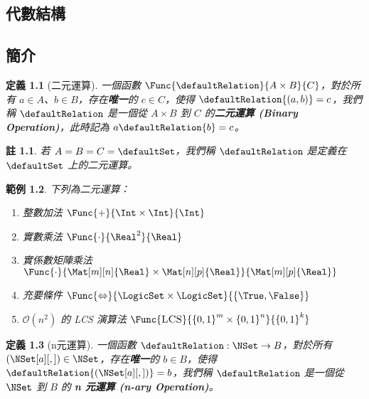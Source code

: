 \documentclass[12pt,a4paper,oneside]{report}
\begin{document}
\begin{CJK}{UTF8}{bkai}
\newtheorem{mydef}{定義}[chapter]
\newtheorem*{mydef*}{定義}
\newtheorem{myrule}[mydef]{原理}
\newtheorem{mythm}[mydef]{定理}
\newtheorem{mylma}[mydef]{引理}
\newtheorem{mypropo}[mydef]{性質}
\newtheorem{mycorol}[mydef]{推論}
\newtheorem{myexample}[mydef]{範例}
\newtheorem*{mynote*}{註}
\renewenvironment{proof}{\textbf{證明}}{\qed}
\newenvironment{mysol}{\textbf{解答}}{\qed}


\fi

\chapter{代數結構}
\section{簡介}

\begin{mydef}[二元運算]
\label{def:algebra:binary_operation}
一個函數 $\Func{\defaultRelation}{A\times{B}}{C}$，對於所有 $a\in{A}$、$b\in{B}$，存在\textbf{唯一}的 $c\in{C}$，使得 $\defaultRelation{(a,b)}=c$，我們稱 $\defaultRelation$ 是一個從 $A\times{B}$ 到 $C$ 的\textbf{二元運算 (Binary Operation)}，此時記為 $a\defaultRelation{b}=c$。
\end{mydef}
\begin{mynote*}
若 $A=B=C=\defaultSet$，我們稱 $\defaultRelation$ 是定義在 $\defaultSet$ 上的二元運算。
\end{mynote*}

\begin{myexample}下列為二元運算：
\begin{enumerate}
\item 整數加法 $\Func{+}{\Int\times{\Int}}{\Int}$
\item 實數乘法 $\Func{\cdot}{\Real^2}{\Real}$
\item 實係數矩陣乘法 $\Func{\cdot}{\Mat[m][n]{\Real}\times\Mat[n][p]{\Real}}{\Mat[m][p]{\Real}}$
\item 充要條件 $\Func{\Leftrightarrow}{{\LogicSet}\times{\LogicSet}}{\left\{{\True,\False}\right\}}$
\item $\mathcal{O}{(n^2)}$ 的 LCS 演算法 $\Func{\textsc{LCS}}{{{\{0,1\}}^{m}}\times{{\{0,1\}}^{n}}}{{\{0,1\}}^{k}}$
\end{enumerate}
\end{myexample}

\begin{mydef}[n元運算]
\label{def:algebra:n_ary_operation}
一個函數 $\defaultRelation: \NSet\rightarrow{B}$，對於所有 ${\left({\NSet[a][,]}\right)}\in{\NSet}$，存在\textbf{唯一}的 $b\in{B}$，使得 $\defaultRelation{\left({\NSet[a][,]}\right)}=b$，我們稱 $\defaultRelation$ 是一個從 $\NSet$ 到 $B$ 的\textbf{ n 元運算 (n-ary Operation)}。
\end{mydef}


\end{CJK}
\end{document}
